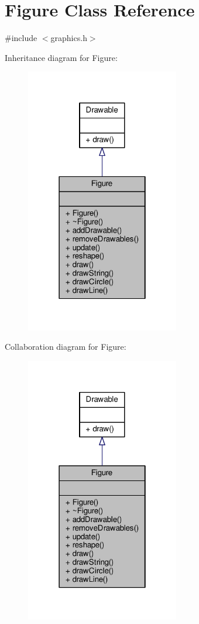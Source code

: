 \hypertarget{classFigure}{}\section{Figure Class Reference}
\label{classFigure}


{\ttfamily \#include $<$graphics.\+h$>$}



Inheritance diagram for Figure\+:
\nopagebreak
\begin{figure}[H]
\begin{center}
\leavevmode
\includegraphics[width=190pt]{classFigure__inherit__graph}
\end{center}
\end{figure}


Collaboration diagram for Figure\+:
\nopagebreak
\begin{figure}[H]
\begin{center}
\leavevmode
\includegraphics[width=190pt]{classFigure__coll__graph}
\end{center}
\end{figure}
